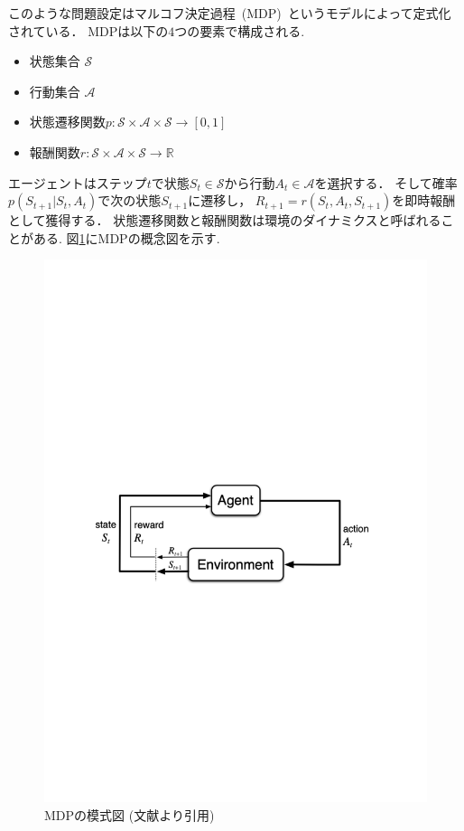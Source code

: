 このような問題設定はマルコフ決定過程~(MDP)~というモデルによって定式化されている．
MDPは以下の$4$つの要素で構成される. 
\begin{itemize}
  \item 状態集合 $\mathcal{S}$
  \item 行動集合 $\mathcal{A}$
  \item 状態遷移関数$p:\mathcal{S} \times \mathcal{A} \times \mathcal{S} \rightarrow [0,1]$
  \item 報酬関数$r:\mathcal{S} \times \mathcal{A} \times \mathcal{S} \rightarrow \mathbb{R}$
\end{itemize}
エージェントはステップ$t$で状態$S_t \in \mathcal{S}$から行動$A_t \in \mathcal{A}$を選択する．
そして確率$p(S_{t+1}|S_t, A_t)$で次の状態$S_{t+1}$に遷移し， $R_{t+1} = r(S_t, A_t, S_{t+1})$を即時報酬として獲得する．
状態遷移関数と報酬関数は環境のダイナミクスと呼ばれることがある. 
図\ref{fig:mdp}にMDPの概念図を示す.
\begin{figure}[h]
  \centering
  \includegraphics[width=\linewidth{}]{figures/MDP.pdf}
  \caption{MDPの模式図 (文献\cite{Sutton1998}より引用) \label{fig:mdp}}
\end{figure}

